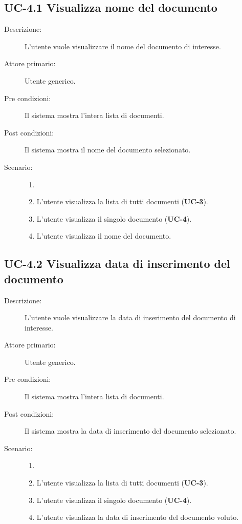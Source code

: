 \subsection{UC-4.1 Visualizza nome del documento}
\begin{description}
    \item[Descrizione:] L'utente vuole visualizzare il nome del documento di interesse.
    \item[Attore primario:] Utente generico.
    \item[Pre condizioni:] Il sistema mostra l’intera lista di documenti.
    \item[Post condizioni:] Il sistema mostra il nome del documento selezionato.
    \item[Scenario:]
    \begin{enumerate}
        \item[]
        \item L’utente visualizza la lista di tutti documenti (\textbf{UC-3}).
        \item L'utente visualizza il singolo documento (\textbf{UC-4}).
        \item L'utente visualizza il nome del documento.
    \end{enumerate} 
\end{description}

\subsection{UC-4.2 Visualizza data di inserimento del documento}
\begin{description}
    \item[Descrizione:] L'utente vuole visualizzare la data di inserimento del documento di interesse.
    \item[Attore primario:] Utente generico.
    \item[Pre condizioni:] Il sistema mostra l’intera lista di documenti.
    \item[Post condizioni:] Il sistema mostra la data di inserimento del documento selezionato.
    \item[Scenario:] 
    \begin{enumerate}
        \item[]
        \item L’utente visualizza la lista di tutti documenti (\textbf{UC-3}).
        \item L'utente visualizza il singolo documento (\textbf{UC-4}).
        \item L'utente visualizza la data di inserimento del documento voluto.
    \end{enumerate}
\end{description}

